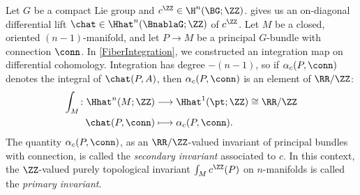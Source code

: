 Let $G$ be a compact Lie group and $c^\ZZ\in\H^n(\BG;\ZZ)$.  gives us an on-diagonal differential lift
$\chat\in\Hhat^n(\BnablaG;\ZZ)$ of $c^\ZZ$. Let $M$ be a closed, oriented $(n-1)$-manifold, and let $P \to M$ be a
principal $G$-bundle with connection $\conn$. In \cref{FiberIntegration}, we constructed an integration map on
differential cohomology. Integration has degree $-(n-1)$, so if $\alpha_c(P,  \conn)$ denotes the integral of
$\chat(P,  A)$, then $\alpha_c(P,  \conn)$ is an element of $\RR/\ZZ$:
\begin{equation}
\begin{aligned}
	\int_M\colon \Hhat^n(M; \ZZ) &\longrightarrow \Hhat^1(\pt; \ZZ)\cong\RR/\ZZ\\
	\chat(P,  \conn) &\longmapsto \alpha_c(P,  \conn).
\end{aligned}
\end{equation}
The quantity $\alpha_c(P, \conn)$, as an $\RR/\ZZ$-valued invariant of principal bundles with connection, is
called the \emph{secondary invariant} associated to $c$. In this context, the $\ZZ$-valued purely topological
invariant $\int_M c^\ZZ(P)$ on $n$-manifolds is called the \emph{primary invariant}.

